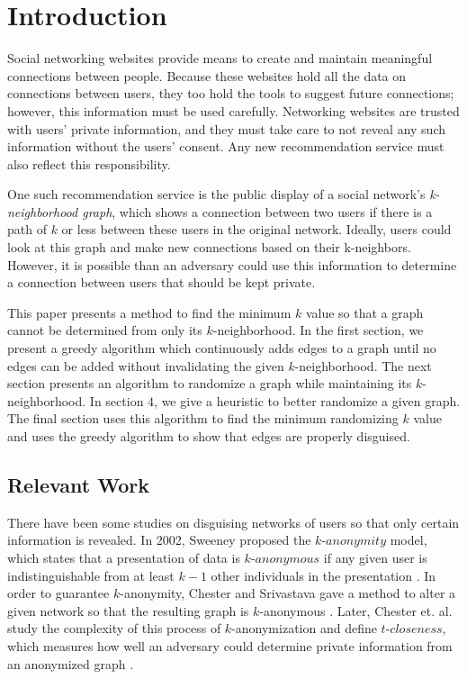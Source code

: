 \section{Introduction}

\indent Social networking websites provide means to create and maintain meaningful connections between people. Because these websites hold all the data on connections between users, they too hold the tools to suggest future connections; however, this information must be used carefully. Networking websites are trusted with users' private information, and they must take care to not reveal any such information without the users' consent. Any new recommendation service must also reflect this responsibility.

\indent One such recommendation service is the public display of a social network's  \emph{k-neighborhood graph}, which shows a connection between two users if there is a path of $k$ or less between these users in the original network. Ideally,  users could look at this graph and make new connections based on their k-neighbors. However, it is possible than an adversary could use this information to determine a connection between users that should be kept private. 

\indent This paper presents a method to find the minimum $k$ value so that a graph cannot be determined from only its $k$-neighborhood. In the first section, we present a greedy algorithm which continuously adds edges to a graph until no edges can be added without invalidating the given $k$-neighborhood. The next section presents an algorithm to randomize a graph while maintaining its $k$-neighborhood. In section $4$, we give a heuristic to better randomize a given graph. The final section uses this algorithm to find the minimum randomizing $k$ value and uses the greedy algorithm to show that edges are properly disguised. 

\subsection {Relevant Work}

\indent There have been some studies on disguising networks of users so that only certain information is revealed. In 2002, Sweeney proposed the $k$-$anonymity$ model, which states that a presentation of data is $k$-$anonymous$ if any given user is indistinguishable from at least $k-1$ other individuals in the presentation \cite{Sweeney02}. In order to guarantee $k$-anonymity, Chester and Srivastava gave a method to alter a given network so that the resulting graph is $k$-anonymous \cite{Chester11}. Later, Chester et. al. study the complexity of this process of $k$-anonymization and define $t$-$closeness$, which measures how well an adversary could determine private information from an anonymized graph \cite{Chester13}.
